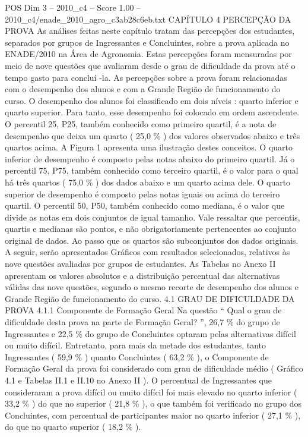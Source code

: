 \begin{textsample}{POS Dim 3 – 2010\_c4 – Score 1.00 – 2010\_c4/enade\_2010\_agro\_c3ab28c6eb.txt}  \label{ex:f3_pos_142}
CAPÍTULO 4 PERCEPÇÃO DA PROVA As análises feitas neste capítulo tratam das percepções dos estudantes, separados por grupos de Ingressantes e Concluintes, sobre a prova aplicada no ENADE/2010 na Área de Agronomia.
Estas percepções foram mensuradas por meio de nove questões que avaliaram desde o grau de dificuldade da prova até o tempo gasto para concluí -la.
As percepções sobre a prova foram relacionadas com o desempenho dos alunos e com a Grande Região de funcionamento do curso.
O desempenho dos alunos foi classificado em dois níveis : quarto inferior e quarto superior.
Para tanto, esse desempenho foi colocado em ordem ascendente.
O percentil 25, P25, também conhecido como primeiro quartil, é a nota de desempenho que deixa um quarto ( 25,0 \% ) dos valores observados abaixo e três quartos acima.
A Figura 1 apresenta uma ilustração destes conceitos.
O quarto inferior de desempenho é composto pelas notas abaixo do primeiro quartil.
Já o percentil 75, P75, também conhecido como terceiro quartil, é o valor para o qual há três quartos ( 75,0 \% ) dos dados abaixo e um quarto acima dele.
O quarto superior de desempenho é composto pelas notas iguais ou acima do terceiro quartil.
O percentil 50, P50, também conhecido como mediana, é o valor que divide as notas em dois conjuntos de igual tamanho.
Vale ressaltar que percentis, quartis e medianas são pontos, e não obrigatoriamente pertencentes ao conjunto original de dados.
Ao passo que os quartos são subconjuntos dos dados originais.
A seguir, serão apresentados Gráficos com resultados selecionados, relativos às nove questões avaliadas por grupos de estudantes.
As Tabelas no Anexo II apresentam os valores absolutos e a distribuição percentual das alternativas válidas das nove questões, segundo o mesmo recorte de desempenho dos alunos e Grande Região de funcionamento do curso. 4.1 GRAU DE DIFICULDADE DA PROVA 4.1.1 Componente de Formação Geral Na questão “ Qual o grau de dificuldade desta prova na parte de Formação Geral? ”, 26,7 \% do grupo de Ingressantes e 22,5 \% do grupo de Concluintes optaram pelas alternativas difícil ou muito difícil.
Entretanto, para mais da metade dos estudantes, tanto Ingressantes ( 59,9 \% ) quanto Concluintes ( 63,2 \% ), o Componente de Formação Geral da prova foi considerado com grau de dificuldade médio ( Gráfico 4.1 e Tabelas II.1 e II.10 no Anexo II ).
O percentual de Ingressantes que consideraram a prova difícil ou muito difícil foi mais elevado no quarto inferior ( 33,2 \% ) do que no superior ( 21,8 \% ), o que também foi verificado no grupo dos Concluintes, com percentual de participantes maior no quarto inferior ( 27,1 \% ), do que no quarto superior ( 18,2 \% ).

\end{textsample}
